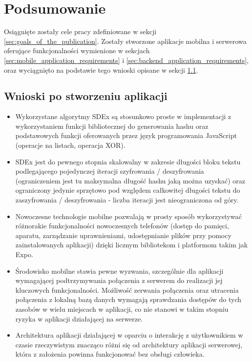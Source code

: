 \documentclass[../main.tex]{subfiles}
\begin{document}
\chapter{Podsumowanie}

Osiągnięte zostały cele pracy zdefiniowane w sekcji \ref{sec:goals_of_the_publication}. Zostały stworzone aplikacje mobilna i serwerowa oferujące funkcjonalności wymienione w sekcjach \ref{sec:mobile_application_requirements} i \ref{sec:backend_application_requirements}, oraz wyciągnięto na podstawie tego wnioski opisane w sekcji \ref{sec:conclusions}.

\section{Wnioski po stworzeniu aplikacji}\label{sec:conclusions}

\begin{itemize}
	\item Wykorzystane algorytmy SDEx są stosunkowo proste w implementacji z wykorzystaniem funkcji bibliotecznej do generowania hashu oraz podstawowych funkcji oferowanych przez język programowania JavaScript (operacje na listach, operacja XOR).
	\item SDEx jest do pewnego stopnia skalowalny w zakresie długości bloku tekstu podlegającego pojedynczej iteracji szyfrowania / deszyfrowania (ograniczeniem jest tu maksymalna długość hashu jaką można uzyskać) oraz ograniczony jedynie sprzętowo pod względem całkowitej długości tekstu do zaszyfrowania / deszyfrowania - liczba iteracji jest nieograniczona od góry.
	\item Nowoczesne technologie mobilne pozwalają w prosty sposób wykorzystywać różnorakie funkcjonalności nowoczesnych telefonów (dostęp do pamięci, aparatu, zarządzanie uprawnieniami, udostępnianie plików przy pomocy zainstalowanych aplikacji) dzięki licznym bibliotekom i platformom takim jak Expo.
	\item Środowisko mobilne stawia pewne wyzwania, szczególnie dla aplikacji wymagającej podtrzymywania połączenia z serwerem do realizacji jej kluczowych funkcjonalności. Możliwość zerwania połączenia oraz utracenia połączenia z lokalną bazą danych wymagają sprawdzania dostępów do tych zasobów w wielu miejscach w aplikacji, co nie stanowi w takim stopniu ryzyka w aplikacji działającej na serwerze.
	\item Architektura aplikacji działającej w oparciu o interakcję z użytkownikiem w czasie rzeczywistym znacząco różni się od architektury aplikacji serwerowej, która z założenia powinna funkcjonować bez obsługi człowieka.
\end{itemize}
\end{document}
